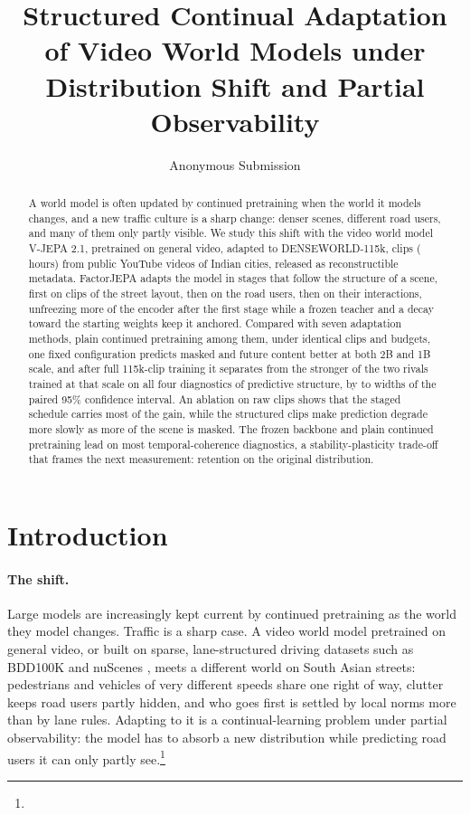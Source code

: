 \documentclass[letterpaper]{article} %
\title{Structured Continual Adaptation of Video World Models under Distribution Shift and Partial Observability}  %
\author{Anonymous Submission}
\begin{document}
\maketitle

\begin{abstract}
A world model is often updated by continued pretraining when the world it models changes, and a new traffic culture is a sharp change: denser scenes, different road users, and many of them only partly visible. We study this shift with the video world model V-JEPA 2.1, pretrained on general video, adapted to DENSEWORLD-115k, \nClips{} clips (\nHours{} hours) from \nVideos{} public YouTube videos of \nCities{} Indian cities, released as reconstructible metadata. FactorJEPA adapts the model in stages that follow the structure of a scene, first on clips of the street layout, then on the road users, then on their interactions, unfreezing more of the encoder after the first stage while a frozen teacher and a decay toward the starting weights keep it anchored. Compared with seven adaptation methods, plain continued pretraining among them, under identical clips and budgets, one fixed configuration predicts masked and future content better at both 2B and 1B scale, and after full 115k-clip training it separates from the stronger of the two rivals trained at that scale on all four diagnostics of predictive structure, by \nSepLo{} to \nSepHi{} widths of the paired 95\% confidence interval. An ablation on raw clips shows that the staged schedule carries most of the gain, while the structured clips make prediction degrade more slowly as more of the scene is masked. The frozen backbone and plain continued pretraining lead on most temporal-coherence diagnostics, a stability-plasticity trade-off that frames the next measurement: retention on the original distribution.
\end{abstract}



\section{Introduction}

\paragraph{The shift.} Large models are increasingly kept current by continued pretraining as the world they model changes. Traffic is a sharp case. A video world model pretrained on general video, or built on sparse, lane-structured driving datasets such as BDD100K \cite{yu2020bdd100k} and nuScenes \cite{caesar2020nuscenes}, meets a different world on South Asian streets: pedestrians and vehicles of very different speeds share one right of way, clutter keeps road users partly hidden, and who goes first is settled by local norms more than by lane rules. Adapting to it is a continual-learning problem under partial observability: the model has to absorb a new distribution while predicting road users it can only partly see.\footnote{\disclosure}
\end{document}

